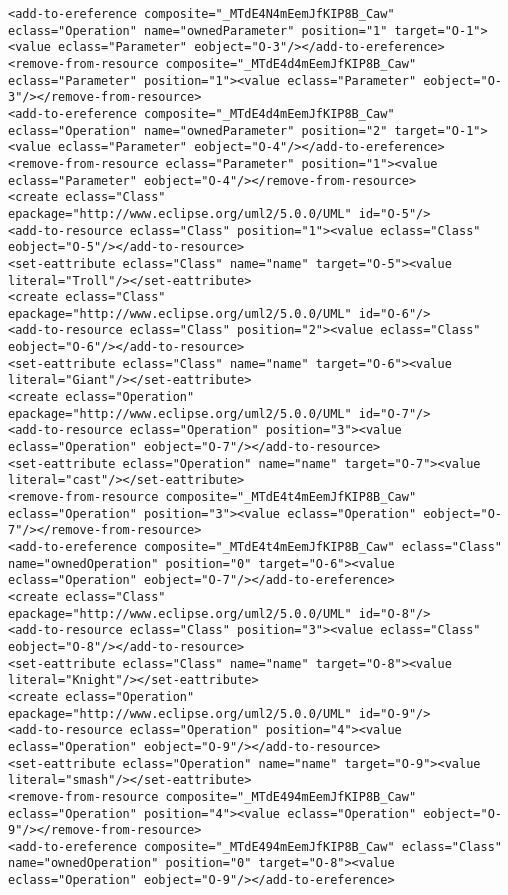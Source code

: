 \begin{lstlisting}[style=cbpfile,caption={Change-based representation of the model in Figure \ref{fig:class_diagram_left}.},label=lst:class_diagram_left_cbpfile]
<add-to-ereference composite="_MTdE4N4mEemJfKIP8B_Caw" eclass="Operation" name="ownedParameter" position="1" target="O-1"><value eclass="Parameter" eobject="O-3"/></add-to-ereference>
<remove-from-resource composite="_MTdE4d4mEemJfKIP8B_Caw" eclass="Parameter" position="1"><value eclass="Parameter" eobject="O-3"/></remove-from-resource>
<add-to-ereference composite="_MTdE4d4mEemJfKIP8B_Caw" eclass="Operation" name="ownedParameter" position="2" target="O-1"><value eclass="Parameter" eobject="O-4"/></add-to-ereference>
<remove-from-resource eclass="Parameter" position="1"><value eclass="Parameter" eobject="O-4"/></remove-from-resource>
<create eclass="Class" epackage="http://www.eclipse.org/uml2/5.0.0/UML" id="O-5"/>
<add-to-resource eclass="Class" position="1"><value eclass="Class" eobject="O-5"/></add-to-resource>
<set-eattribute eclass="Class" name="name" target="O-5"><value literal="Troll"/></set-eattribute>
<create eclass="Class" epackage="http://www.eclipse.org/uml2/5.0.0/UML" id="O-6"/>
<add-to-resource eclass="Class" position="2"><value eclass="Class" eobject="O-6"/></add-to-resource>
<set-eattribute eclass="Class" name="name" target="O-6"><value literal="Giant"/></set-eattribute>
<create eclass="Operation" epackage="http://www.eclipse.org/uml2/5.0.0/UML" id="O-7"/>
<add-to-resource eclass="Operation" position="3"><value eclass="Operation" eobject="O-7"/></add-to-resource>
<set-eattribute eclass="Operation" name="name" target="O-7"><value literal="cast"/></set-eattribute>
<remove-from-resource composite="_MTdE4t4mEemJfKIP8B_Caw" eclass="Operation" position="3"><value eclass="Operation" eobject="O-7"/></remove-from-resource>
<add-to-ereference composite="_MTdE4t4mEemJfKIP8B_Caw" eclass="Class" name="ownedOperation" position="0" target="O-6"><value eclass="Operation" eobject="O-7"/></add-to-ereference>
<create eclass="Class" epackage="http://www.eclipse.org/uml2/5.0.0/UML" id="O-8"/>
<add-to-resource eclass="Class" position="3"><value eclass="Class" eobject="O-8"/></add-to-resource>
<set-eattribute eclass="Class" name="name" target="O-8"><value literal="Knight"/></set-eattribute>
<create eclass="Operation" epackage="http://www.eclipse.org/uml2/5.0.0/UML" id="O-9"/>
<add-to-resource eclass="Operation" position="4"><value eclass="Operation" eobject="O-9"/></add-to-resource>
<set-eattribute eclass="Operation" name="name" target="O-9"><value literal="smash"/></set-eattribute>
<remove-from-resource composite="_MTdE494mEemJfKIP8B_Caw" eclass="Operation" position="4"><value eclass="Operation" eobject="O-9"/></remove-from-resource>
<add-to-ereference composite="_MTdE494mEemJfKIP8B_Caw" eclass="Class" name="ownedOperation" position="0" target="O-8"><value eclass="Operation" eobject="O-9"/></add-to-ereference>

\end{lstlisting}
